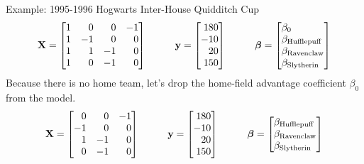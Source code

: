 \documentclass{article}
\begin{document}
  \begin{framed}
    {\sc Example:} 1995-1996 Hogwarts Inter-House Quidditch Cup\\
    $$
      {\bf X} = \begin{bmatrix*}[r]
        1 &  0 &  0 & -1\\
        1 & -1 &  0 &  0\\
        1 &  1 & -1 &  0\\
        1 &  0 & -1 &  0\\
      \end{bmatrix*}
      \hspace{1cm}
      {\bf y} = \begin{bmatrix*}[r] 180 \\ -10 \\ 20 \\ 150 \end{bmatrix*}
      \hspace{1cm}
      \boldsymbol{\beta} = \begin{bmatrix*}[l]
        \beta_0\\
        \beta_{\mbox{\scriptsize Hufflepuff}}\\
        \beta_{\mbox{\scriptsize Ravenclaw}}\\
        \beta_{\mbox{\scriptsize Slytherin}}
      \end{bmatrix*}
    $$
    Because there is no home team, let's drop the home-field advantage coefficient $\beta_0$ from the model.
    $$
      {\bf X} = \begin{bmatrix*}[r]
         0 &  0 & -1\\
        -1 &  0 &  0\\
         1 & -1 &  0\\
         0 & -1 &  0\\
      \end{bmatrix*}
      \hspace{1cm}
      {\bf y} = \begin{bmatrix*}[r] 180 \\ -10 \\ 20 \\ 150 \end{bmatrix*}
      \hspace{1cm}
      \boldsymbol{\beta} = \begin{bmatrix*}[l]
        \beta_{\mbox{\scriptsize Hufflepuff}} \\
        \beta_{\mbox{\scriptsize Ravenclaw}} \\
        \beta_{\mbox{\scriptsize Slytherin}}

\end{bmatrix*}$$
\end{framed}
\end{document}
